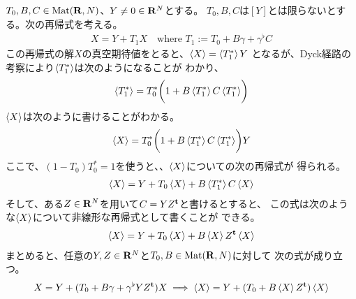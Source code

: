 {	$T_0,B,C\in{\ensuremath{\operatorname{Mat}}}(\mathbf{R},N)$、$Y\neq0\in\mathbf{R}^N$とする。
	$T_0,B,C$は$[Y]$とは限らないとする。次の再帰式を考える。
	\begin{equation*}\begin{split}
		X = Y + T_1X \quad\text{where } T_1 := T_0 + B\gamma + \gamma^\flat C
	\end{split}\end{equation*}
	この再帰式の解$X$の真空期待値をとると、$\mathinner{\langle{X}\rangle}=\mathinner{\langle{T_1^*}\rangle}Y$
	となるが、Dyck経路の考察により$\mathinner{\langle{T_1^*}\rangle}$は次のようになることが
	わかり、
	\begin{equation*}\begin{split}
		\mathinner{\langle{T_1^*}\rangle} = T_0^*\biggl(1 + B\mathinner{\langle{T_1^*}\rangle}C\mathinner{\langle{T_1^*}\rangle}\biggr)
	\end{split}\end{equation*}
	$\mathinner{\langle{X}\rangle}$は次のように書けることがわかる。
	\begin{equation*}\begin{split}
		\mathinner{\langle{X}\rangle} = T_0^*\biggl(1 + B\mathinner{\langle{T_1^*}\rangle}C\mathinner{\langle{T_1^*}\rangle}\biggr)Y
	\end{split}\end{equation*}
	ここで、$(1-T_0)T_0^*=1$を使うと、、$\mathinner{\langle{X}\rangle}$についての次の再帰式が
	得られる。
	\begin{equation*}\begin{split}
		\mathinner{\langle{X}\rangle} = Y + T_0\mathinner{\langle{X}\rangle} + B\mathinner{\langle{T_1^*}\rangle}C\mathinner{\langle{X}\rangle}
	\end{split}\end{equation*}
	そして、ある$Z\in\mathbf{R}^N$を用いて$C=YZ^{\mathbf{t}}$と書けるとすると、
	この式は次のような$\mathinner{\langle{X}\rangle}$について非線形な再帰式として書くことが
	できる。
	\begin{equation*}\begin{split}
		\mathinner{\langle{X}\rangle} = Y + T_0\mathinner{\langle{X}\rangle} + B\mathinner{\langle{X}\rangle}Z^{\mathbf{t}}\mathinner{\langle{X}\rangle}
	\end{split}\end{equation*}
	まとめると、任意の$Y,Z\in\mathbf{R}^N$と$T_0,B\in{\ensuremath{\operatorname{Mat}}}(\mathbf{R},N)$に対して
	次の式が成り立つ。
	\begin{equation*}\begin{split}
		X = Y + (T_0 + B\gamma + \gamma^\flat YZ^{\mathbf{t}})X
		\implies \mathinner{\langle{X}\rangle} = Y + (T_0 + B\mathinner{\langle{X}\rangle}Z^{\mathbf{t}})\mathinner{\langle{X}\rangle}
	\end{split}\end{equation*}

}

